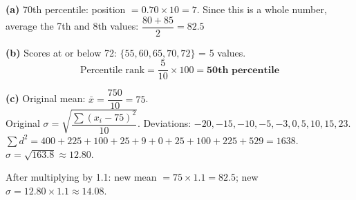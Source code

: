 \documentclass[addpoints]{exam}
\begin{document}
\begin{questions}
\begin{solution}[7cm]
\textbf{(a)} 70th percentile: position $= 0.70 \times 10 = 7$. Since this is a whole number,
average the 7th and 8th values: $\dfrac{80+85}{2} = \mathbf{82.5}$

\textbf{(b)} Scores at or below 72: $\{55, 60, 65, 70, 72\}$ = 5 values.
\[
\text{Percentile rank} = \frac{5}{10} \times 100 = \mathbf{50\text{th percentile}}
\]

\textbf{(c)} Original mean: $\bar{x} = \dfrac{750}{10} = 75$.\\
Original $\sigma = \sqrt{\dfrac{\sum(x_i-75)^2}{10}}$. Deviations: $-20,-15,-10,-5,-3,0,5,10,15,23$.
$\sum d^2 = 400+225+100+25+9+0+25+100+225+529 = 1638$.
$\sigma = \sqrt{163.8} \approx 12.80$.

After multiplying by 1.1: new mean $= 75 \times 1.1 = \mathbf{82.5}$;
new $\sigma = 12.80 \times 1.1 \approx \mathbf{14.08}$.
\end{solution}

\end{questions}
\end{document}
